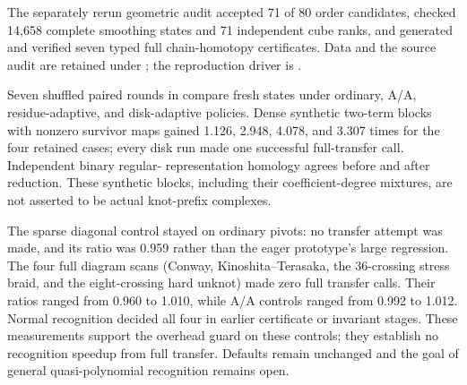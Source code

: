 The separately rerun geometric audit accepted 71 of 80 order candidates,
checked 14,658 complete smoothing states and 71 independent cube ranks,
and generated and verified seven typed full chain-homotopy certificates.
Data and the source audit are retained under ; the
reproduction driver is .

Seven shuffled paired rounds in 
compare fresh states under ordinary, A/A, residue-adaptive, and disk-adaptive
policies. Dense synthetic two-term blocks with nonzero survivor maps gained
1.126, 2.948, 4.078, and 3.307 times for the four retained cases; every disk
run made one successful full-transfer call. Independent binary regular-
representation homology agrees before and after reduction. These synthetic
blocks, including their coefficient-degree mixtures, are not asserted to be
actual knot-prefix complexes.

The sparse diagonal control stayed on ordinary pivots: no transfer attempt
was made, and its ratio was 0.959 rather than the eager prototype's large
regression. The four full diagram scans (Conway, Kinoshita--Terasaka, the
36-crossing stress braid, and the eight-crossing hard unknot) made zero full
transfer calls. Their ratios ranged from 0.960 to 1.010, while A/A controls
ranged from 0.992 to 1.012. Normal recognition decided all four in earlier
certificate or invariant stages. These measurements support the overhead
guard on these controls; they establish no recognition speedup from full
transfer. Defaults remain unchanged and the goal of general quasi-polynomial
recognition remains open.
